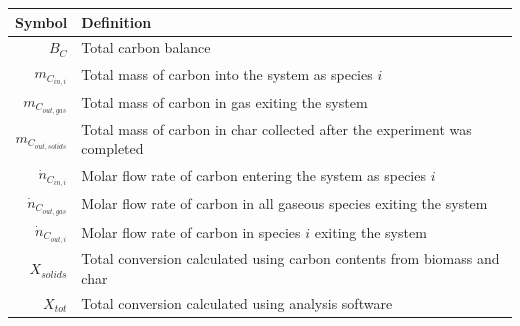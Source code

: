 \documentclass[11pt,twocolumn]{article}
\begin{document}
\begin{center}
	\begin{tabular}{r l}
	\toprule
	Symbol					&	Definition	\\
	\midrule
	$B_C$					&	Total carbon balance	\\
	$m_{C_{in, i}}$			&	Total mass of carbon into the system as species $i$	\\
	$m_{C_{out, gas}}$			&	Total mass of carbon in gas exiting the system	\\
	$m_{C_{out, solids}}$		&	Total mass of carbon in char collected after the experiment was completed	\\
	$\dot{n}_{C_{in,i}}$		&	Molar flow rate of carbon entering the system as species $i$	\\
	$\dot{n}_{C_{out,gas}}$		&	Molar flow rate of carbon in all gaseous species exiting the system		\\
	$\dot{n}_{C_{out,i}}$		&	Molar flow rate of carbon in species $i$ exiting the system		\\
	$X_{solids}$				&	Total conversion calculated using carbon contents from biomass and char	\\
	$X_{tot}$					&	Total conversion calculated using analysis software	\\
	\bottomrule
	\end{tabular}
\end{center}
\end{document}
